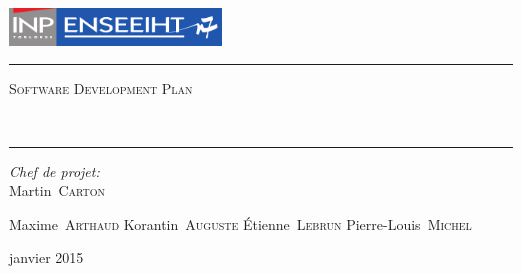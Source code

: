 \begin{titlepage}
  \begin{center}
    \includegraphics[height=1cm]{LogoEnseeiht}\\\vspace{1cm}
    \hrule\vspace{0.5cm}
    \textsc{\Large Software Development Plan}
    \\\vspace{0.5cm}

    \textbf{\huge\thetitle}
    \\\vspace{0.4cm}
    \hrule\vspace{2cm}

    \begin{minipage}{0.4\textwidth}
      \begin{flushleft} \large
        \emph{Chef de projet:}\\\hspace{1cm}Martin~\textsc{Carton}
      \end{flushleft}
    \end{minipage}
    \begin{minipage}{0.4\textwidth}
      \begin{flushright} \large
          Maxime~\textsc{Arthaud}
          Korantin~\textsc{Auguste}
          Étienne~\textsc{Lebrun}
          Pierre-Louis~\textsc{Michel}
      \end{flushright}
    \end{minipage}

    \vfill
    {\large janvier 2015}
  \end{center}
\end{titlepage}
